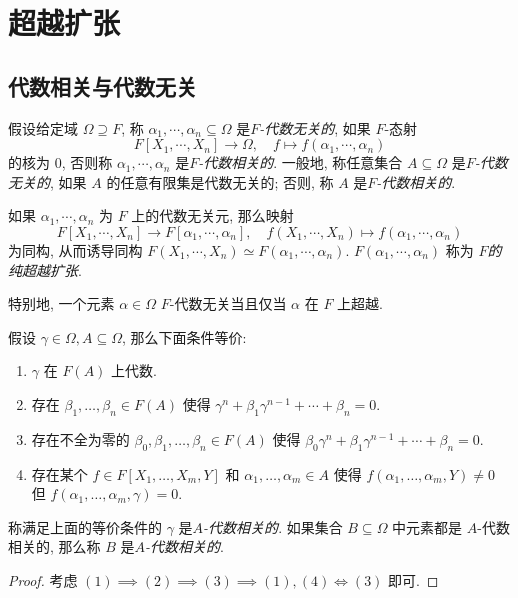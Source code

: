 \section{超越扩张}

\subsection{代数相关与代数无关}

假设给定域 \( \Omega \supseteq F \), 称 \( \alpha_1, \cdots, \alpha_n \subseteq
\Omega \) 是\emph{\( F \)-代数无关的}, 如果 \( F \)-态射
\[
  F[X_1, \cdots, X_n] \to \Omega,\quad f \mapsto f(\alpha_1, \cdots, \alpha_n)
\]
的核为 \( 0 \), 否则称 \( \alpha_1, \cdots, \alpha_n \) 是\emph{\( F
\)-代数相关的}.
一般地, 称任意集合 \( A \subseteq \Omega \) 是\emph{\( F \)-代数无关的}, 如果 \(
A \) 的任意有限集是代数无关的; 否则, 称 \( A \) 是\emph{\( F \)-代数相关的}.

如果 \( \alpha_1,\cdots, \alpha_n \) 为 \( F \) 上的代数无关元, 那么映射
\[
  F[X_1, \cdots, X_n] \to F[\alpha_1, \cdots, \alpha_n],\quad f(X_1, \cdots,
  X_n) \mapsto f(\alpha_1, \cdots, \alpha_n)
\]
为同构, 从而诱导同构 \( F(X_1, \cdots, X_n) \simeq F(\alpha_1, \cdots, \alpha_n) \).
\( F(\alpha_1,\cdots, \alpha_n) \) 称为 \emph{\( F \)的纯超越扩张}.

\begin{example}
  特别地, 一个元素 \( \alpha \in \Omega \) \( F \)-代数无关当且仅当 \( \alpha \) 在 \(
  F \) 上超越.
\end{example}

\begin{lemma}
  \label{lemma-algebraic-dependent-TFAE-conditions}
  假设 \( \gamma \in \Omega, A \subseteq \Omega \), 那么下面条件等价:
  \begin{enumerate}
    \item \( \gamma \) 在 \( F(A) \) 上代数.
    \item 存在 \( \beta_1, \ldots, \beta_n \in F(A) \) 使得 \( \gamma^n +
      \beta_1 \gamma^{n - 1} + \cdots + \beta_n = 0 \).
    \item 存在不全为零的 \( \beta_0, \beta_1, \ldots, \beta_n \in F(A) \) 使得
      \( \beta_0\gamma^n + \beta_1 \gamma^{n - 1} + \cdots + \beta_n = 0 \).
    \item 存在某个 \( f \in F[X_1, \ldots, X_m, Y] \) 和 \( \alpha_1, \ldots,
      \alpha_m \in A \) 使得 \( f(\alpha_1, \ldots, \alpha_m, Y) \neq 0 \) 但 \(
      f(\alpha_1, \ldots, \alpha_m, \gamma) = 0 \).
  \end{enumerate}
  称满足上面的等价条件的 \( \gamma \) 是\emph{\( A \)-代数相关的}.
  如果集合 \( B \subseteq \Omega \) 中元素都是 \( A \)-代数相关的, 那么称 \( B
  \) 是\emph{\( A \)-代数相关的}.
\end{lemma}
\begin{proof}
  考虑 \( (1) \implies (2) \implies (3) \implies (1), (4) \iff (3) \) 即可.
\end{proof}

